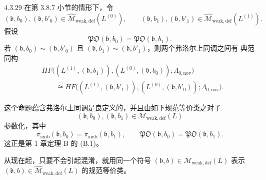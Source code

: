 \begin{proposition}{4.3.29}\label{prop:4-3-29}
在第 3.8.7 小节的情形下，令
\[
 (\mathfrak b,b_0),(\mathfrak b,b'_0)
 \in\widehat{\mathcal M}_{\mathrm{weak,def}}(L^{(0)}),
 \qquad
 (\mathfrak b,b_1),(\mathfrak b,b'_1)
 \in\widehat{\mathcal M}_{\mathrm{weak,def}}(L^{(1)}).
\]
假设
\[
 \mathfrak{PO}(\mathfrak b,b_0)
 =\mathfrak{PO}(\mathfrak b,b_1).
\]
若
$(\mathfrak b,b_0)\sim(\mathfrak b,b'_0)$ 且
$(\mathfrak b,b_1)\sim(\mathfrak b,b'_1)$，则两个弗洛尔上同调之间有
典范同构
\[
 \begin{aligned}
 &HF\bigl(
 (L^{(1)},(\mathfrak b,b_1)),
 (L^{(0)},(\mathfrak b,b_0));
 \Lambda_{0,\mathrm{nov}}
 \bigr)\\
 &\qquad\cong
 HF\bigl(
 (L^{(1)},(\mathfrak b,b'_1)),
 (L^{(0)},(\mathfrak b,b'_0));
 \Lambda_{0,\mathrm{nov}}
 \bigr).
 \end{aligned}
\]
\end{proposition}

这个命题蕴含弗洛尔上同调是良定义的，并且由如下规范等价类之对子
\[
 (\mathfrak b,b_0),(\mathfrak b,b_1)
 \in\mathcal M_{\mathrm{weak,def}}(L)
\]
参数化，其中
\[
 \pi_{\mathrm{amb}}(\mathfrak b,b_0)
 =\pi_{\mathrm{amb}}(\mathfrak b,b_1),
 \qquad
 \mathfrak{PO}(\mathfrak b,b_0)
 =\mathfrak{PO}(\mathfrak b,b_1).
\]
这正是第 1 章定理 B 的 (B.1)。

从现在起，只要不会引起混淆，就用同一个符号
$(\mathfrak b,b)\in\mathcal M_{\mathrm{weak,def}}(L)$ 表示
$(\mathfrak b,b)\in\widehat{\mathcal M}_{\mathrm{weak,def}}(L)$ 的规范等价类。
